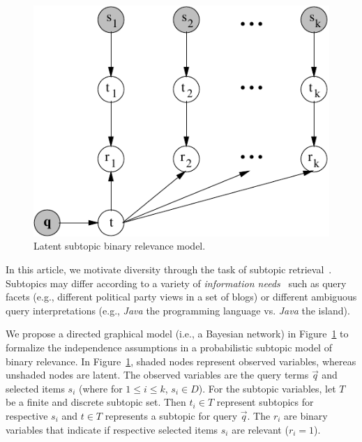 \begin{figure}[t!]
\centerline{\includegraphics[scale = .8]{graphicalModel}}
\vspace{-2mm}
\caption{Latent subtopic binary relevance model.}
\vspace{-3mm}
\label{fig:gm}
\end{figure}

In this article, we motivate diversity through the task of subtopic
retrieval~\cite{zhai03Beyond}.  Subtopics may differ according to a
variety of \emph{information needs}~\cite{diversity_types} such as
query facets (e.g., different political party views in a set of
blogs) or different ambiguous query interpretations (e.g.,
\emph{Java} the programming language vs. \emph{Java} the island).

We propose a directed graphical model (i.e., a Bayesian network) in
Figure~\ref{fig:gm} to formalize the independence assumptions in a
probabilistic subtopic model of binary relevance.  In
Figure~\ref{fig:gm}, shaded nodes represent observed variables,
whereas unshaded nodes are latent. The observed variables are the
query terms $\vec{q}$ and selected items $s_i$ (where for $1 \leq i
\leq k$, $s_i\in D$).  For the subtopic variables, let $T$ be a finite
and discrete subtopic set.  Then $t_i \in T$ represent subtopics for
respective $s_i$ and $t \in T$ represents a subtopic for query
$\vec{q}$.  The $r_i$ are binary variables that indicate if respective
selected items $s_i$ are relevant ($r_i=1$).

